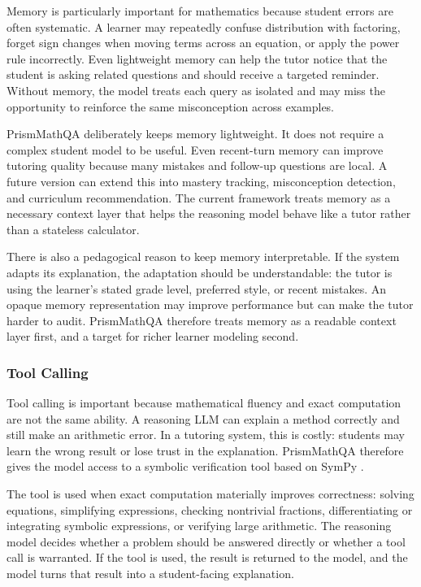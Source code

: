 Memory is particularly important for mathematics because student errors are often systematic. A learner may repeatedly confuse distribution with factoring, forget sign changes when moving terms across an equation, or apply the power rule incorrectly. Even lightweight memory can help the tutor notice that the student is asking related questions and should receive a targeted reminder. Without memory, the model treats each query as isolated and may miss the opportunity to reinforce the same misconception across examples.

PrismMathQA deliberately keeps memory lightweight. It does not require a complex student model to be useful. Even recent-turn memory can improve tutoring quality because many mistakes and follow-up questions are local. A future version can extend this into mastery tracking, misconception detection, and curriculum recommendation. The current framework treats memory as a necessary context layer that helps the reasoning model behave like a tutor rather than a stateless calculator.

There is also a pedagogical reason to keep memory interpretable. If the system adapts its explanation, the adaptation should be understandable: the tutor is using the learner's stated grade level, preferred style, or recent mistakes. An opaque memory representation may improve performance but can make the tutor harder to audit. PrismMathQA therefore treats memory as a readable context layer first, and a target for richer learner modeling second.

\subsubsection{Tool Calling}

Tool calling is important because mathematical fluency and exact computation are not the same ability. A reasoning LLM can explain a method correctly and still make an arithmetic error. In a tutoring system, this is costly: students may learn the wrong result or lose trust in the explanation. PrismMathQA therefore gives the model access to a symbolic verification tool based on SymPy \citep{meurer2017sympy}.

The tool is used when exact computation materially improves correctness: solving equations, simplifying expressions, checking nontrivial fractions, differentiating or integrating symbolic expressions, or verifying large arithmetic. The reasoning model decides whether a problem should be answered directly or whether a tool call is warranted. If the tool is used, the result is returned to the model, and the model turns that result into a student-facing explanation.

